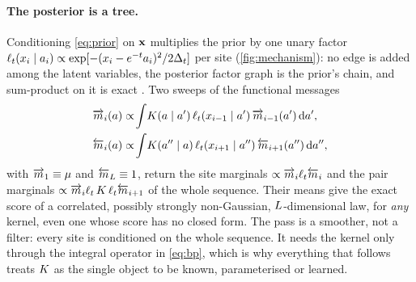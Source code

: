 \paragraph{The posterior is a tree.}
Conditioning \cref{eq:prior} on $\mathbf{x}$ multiplies the prior by one unary factor
$\ell_t(x_i\mid a_i)\propto\exp[-(x_i-e^{-t}a_i)^2/2\Delta_t]$ per site (\cref{fig:mechanism}): no
edge is added among the latent variables, the posterior factor graph is the prior's chain, and
sum-product on it is exact \citep{pearl1988probabilistic,kschischang2001factor}. Two sweeps of
the functional messages
\begin{equation}
\begin{aligned}
  \overrightarrow{m}_i(a)&\propto\!\int\!K(a\mid a')\,\ell_t(x_{i-1}\mid a')\,\overrightarrow{m}_{i-1}(a')\,\mathrm{d} a',\\
  \overleftarrow{m}_i(a)&\propto\!\int\!K(a''\mid a)\,\ell_t(x_{i+1}\mid a'')\,\overleftarrow{m}_{i+1}(a'')\,\mathrm{d} a'',
\end{aligned}
\label{eq:bp}
\end{equation}
with $\overrightarrow{m}_1\equiv\mu$ and $\overleftarrow{m}_{L}\equiv1$, return the site marginals
$\propto\overrightarrow{m}_i\ell_t\overleftarrow{m}_i$ and the pair marginals $\propto\overrightarrow{m}_i\ell_t\,K\,\ell_t\overleftarrow{m}_{i+1}$
of the whole sequence. Their means give the exact score of a correlated, possibly strongly
non-Gaussian, $L$-dimensional law, for \emph{any} kernel, even one whose score has no closed
form. The pass is a smoother, not a filter: every site is conditioned on the whole sequence. It
needs the kernel only through the integral operator in \cref{eq:bp}, which is why everything
that follows treats $K$ as the single object to be known, parameterised or learned.

